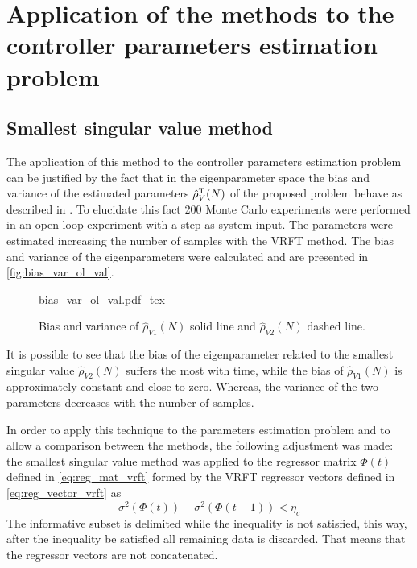 
\section{\label{sec:application} Application of the methods to the controller parameters estimation problem}

\subsection{Smallest singular value method}
The application of this method to the controller parameters estimation problem can be justified by the fact that in the eigenparameter space the bias and variance of the estimated parameters $\hat{\rho}_{V}^\text{T}(N)$ of the proposed problem behave as described in \cite{carrette1996discarding}.
To elucidate this fact 200 Monte Carlo experiments were performed in an open loop experiment with a step as system input.
The parameters were estimated increasing the number of samples with the VRFT method.
The bias and variance of the eigenparameters were calculated and are presented in \autoref{fig:bias_var_ol_val}.
\begin{figure}[h!]
  \centering
  \def\svgwidth{\columnwidth}
  {\footnotesize{bias_var_ol_val.pdf_tex}}
  \caption{\label{fig:bias_var_ol_val} Bias and variance of $\hat{\rho}_{V1}(N)$ solid line and $\hat{\rho}_{V2}(N)$ dashed line.}
\end{figure}

It is possible to see that the bias of the eigenparameter related to the smallest singular value $\hat{\rho}_{V2}(N)$ suffers the most with time, while the bias of $\hat{\rho}_{V1}(N)$ is approximately constant and close to zero.
Whereas, the variance of the two parameters decreases with the number of samples.


In order to apply this technique to the parameters estimation problem and to allow a comparison between the methods, the following adjustment was made:
the smallest singular value method was applied to the regressor matrix $\Phi(t)$ defined in \eqref{eq:reg_mat_vrft} formed by the VRFT regressor vectors defined in \eqref{eq:reg_vector_vrft} as
\[
  \underline{\sigma}^2(\Phi(t)) - \underline{\sigma}^2(\Phi(t-1)) < \eta_c
\]
The informative subset is delimited while the inequality is not satisfied, this way, after the inequality be satisfied all remaining data is discarded.
That means that the regressor vectors are not concatenated.


